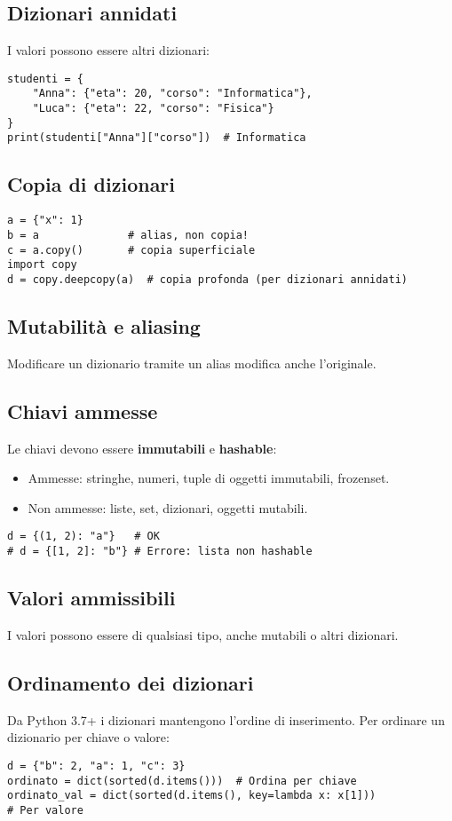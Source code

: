 \documentclass[a4paper,12pt]{article}
\begin{document}
\subsection*{Dizionari annidati}
I valori possono essere altri dizionari:
\begin{lstlisting}
studenti = {
    "Anna": {"eta": 20, "corso": "Informatica"},
    "Luca": {"eta": 22, "corso": "Fisica"}
}
print(studenti["Anna"]["corso"])  # Informatica
\end{lstlisting}

\subsection*{Copia di dizionari}
\begin{lstlisting}
a = {"x": 1}
b = a              # alias, non copia!
c = a.copy()       # copia superficiale
import copy
d = copy.deepcopy(a)  # copia profonda (per dizionari annidati)
\end{lstlisting}

\subsection*{Mutabilità e aliasing}
Modificare un dizionario tramite un alias modifica anche l'originale.

\subsection*{Chiavi ammesse}
Le chiavi devono essere \textbf{immutabili} e \textbf{hashable}:
\begin{itemize}
    \item Ammesse: stringhe, numeri, tuple di oggetti immutabili, frozenset.
    \item Non ammesse: liste, set, dizionari, oggetti mutabili.
\end{itemize}
\begin{lstlisting}
d = {(1, 2): "a"}   # OK
# d = {[1, 2]: "b"} # Errore: lista non hashable
\end{lstlisting}

\subsection*{Valori ammissibili}
I valori possono essere di qualsiasi tipo, anche mutabili o altri dizionari.

\subsection*{Ordinamento dei dizionari}
Da Python 3.7+ i dizionari mantengono l'ordine di inserimento. Per ordinare un dizionario per chiave o valore:
\begin{lstlisting}
d = {"b": 2, "a": 1, "c": 3}
ordinato = dict(sorted(d.items()))  # Ordina per chiave
ordinato_val = dict(sorted(d.items(), key=lambda x: x[1]))
# Per valore
\end{lstlisting}
\end{document}
